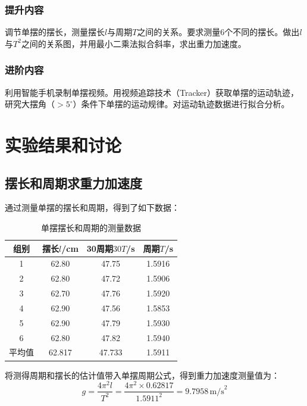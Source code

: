 \documentclass[a4paper]{extarticle}
\begin{document}
    \subsubsection{提升内容}
    \hspace{2em}
    调节单摆的摆长，测量摆长$l$与周期$T$之间的关系。要求测量6个不同的摆长。做出$l$与$T^2$之间的关系图，并用最小二乘法拟合斜率，求出重力加速度。
    \subsubsection{进阶内容}
    \hspace{2em}
    利用智能手机录制单摆视频。用视频追踪技术（Tracker）获取单摆的运动轨迹，研究大摆角（$>5^{\circ}$）条件下单摆的运动规律。对运动轨迹数据进行拟合分析。
    \section{实验结果和讨论}
    \subsection{摆长和周期求重力加速度}
    \hspace{2em}
    通过测量单摆的摆长和周期，得到了如下数据：
    \begin{table}[H]
        \centering
        \caption{单摆摆长和周期的测量数据}
        \begin{tabular}{cccc}
            \toprule
            组别&摆长$l$/cm&30周期$30T$/s&周期$T$/s\\
            \midrule
            1&62.80&47.75&1.5916\\
            2&62.80&47.72&1.5906\\
            3&62.70&47.76&1.5920\\
            4&62.90&47.56&1.5853\\
            5&62.90&47.79&1.5930\\
            6&62.80&47.82&1.5940\\
            \midrule
            平均值&62.817&47.733&1.5911\\
            \bottomrule
        \end{tabular}
    \end{table}
    \par\hspace{2em}
    将测得周期和摆长的估计值带入单摆周期公式，得到重力加速度测量值为：
    \begin{equation*}
        g=\frac{4\pi^2l}{T^2}=\frac{4\pi^2\times0.62817}{1.5911^2}=9.7958\,\text{m/s}^2
    \end{equation*}
\end{document}
